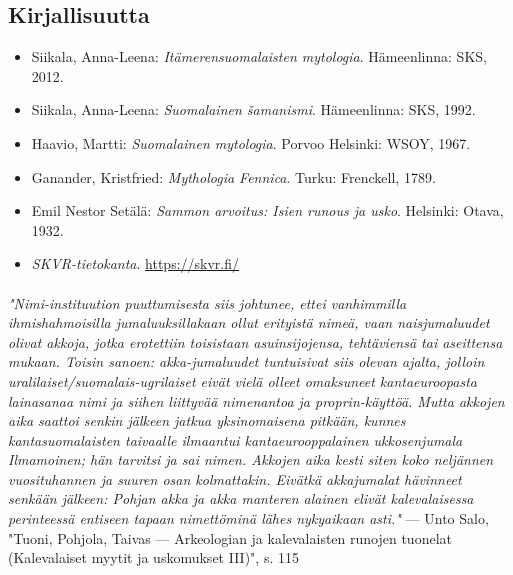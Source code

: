 \subsection{Kirjallisuutta}

  \begin{itemize}
    \item Siikala, Anna-Leena: \emph{Itämerensuomalaisten mytologia}. Hämeenlinna: SKS, 2012.
    \item Siikala, Anna-Leena: \emph{Suomalainen šamanismi}. Hämeenlinna: SKS, 1992.
    \item Haavio, Martti: \emph{Suomalainen mytologia}. Porvoo Helsinki: WSOY, 1967.
    \item Ganander, Kristfried: \emph{Mythologia Fennica}. Turku: Frenckell, 1789.
    \item Emil Nestor Setälä: \emph{Sammon arvoitus: Isien runous ja usko}. Helsinki: Otava, 1932.
    \item \emph{SKVR-tietokanta}. \url{https://skvr.fi/}
  \end{itemize}

  \paragraph{}
    \emph{"Nimi-instituution puuttumisesta siis johtunee, ettei vanhimmilla ihmishahmoisilla
    jumaluuksillakaan ollut erityistä nimeä, vaan naisjumaluudet olivat akkoja, jotka erotettiin
    toisistaan asuinsijojensa, tehtäviensä tai aseittensa mukaan. Toisin sanoen: akka-jumaluudet
    tuntuisivat siis olevan ajalta, jolloin uralilaiset/suomalais-ugrilaiset eivät vielä olleet
    omaksuneet kantaeuroopasta lainasanaa nimi ja siihen liittyvää nimenantoa ja proprin-käyttöä.
    Mutta akkojen aika saattoi senkin jälkeen jatkua yksinomaisena pitkään, kunnes kantasuomalaisten
    taivaalle ilmaantui kantaeurooppalainen ukkosenjumala Ilmamoinen; hän tarvitsi ja sai nimen.
    Akkojen aika kesti siten koko neljännen vuosituhannen ja suuren osan kolmattakin. Eivätkä
    akkajumalat hävinneet senkään jälkeen: Pohjan akka ja akka manteren alainen elivät kalevalaisessa
    perinteessä entiseen tapaan nimettöminä lähes nykyaikaan asti."} --- Unto Salo, "Tuoni, Pohjola,
    Taivas --- Arkeologian ja kalevalaisten runojen tuonelat (Kalevalaiset myytit ja
    uskomukset III)", s. 115
